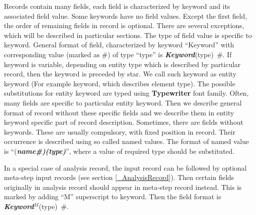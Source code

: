 \documentclass[a4paper]{article}
\newcommand{\fieldVal}[2]{\mbox{({\it\bf{#1}\#)\tiny (#2)}}}
\newcommand{\keywordnotype}[1]{\mbox{{\it{\bf{#1}}}}}
\newcommand{\keyword}[2]{\mbox{{\keywordnotype{#1}\tiny (#2)}}}
\newcommand{\entKeywordInst}[1]{\mbox{{\bf{{#1}}}}}
\newcommand{\field}[2]{\mbox{\keyword{#1}{#2}~\#}}
\begin{document}
Records contain many fields, each field is characterized by
keyword and its associated  field value. Some keywords have no field  values.
Except the first field, the order of remaining fields in record is
optional. There are several 
exceptions, which will be described in particular sections.
The type of field value is specific to  keyword. 
General format of field, characterized by keyword ``Keyword'' with
corresponding value (marked as \#) of type ``type'' is
\field{Keyword}{type}.
If keyword is variable, depending on entity type which is 
described by particular record, then the keyword is preceded by star. We call such keyword
as entity keyword (For example keyword, which  describes  element
type). The possible 
substitutions for entity keyword are typed using
\entKeywordInst{Typewriter} font family.
Often, many fields are specific to particular entity keyword. Then we describe
general format of record without these specific fields and we describe
them in entity keyword specific part of record description.
Sometimes, there are fields without keywords. These are usually
compulsory, with fixed position in record. Their occurrence is
described using so called named values. The format of named value is
``\fieldVal{name}{type}'', where a value of required type should be
substituted.

In a special case of analysis record, the input record can be followed
by optional meta-step input records (see section
\ref{_AnalysisRecord}). Then certain fields originally in analysis
record should appear in meta-step record instead. This is marked by
adding ``M'' superscript to keyword. Then the field format is \field{Keyword$^M$}{type}.
\end{document}
